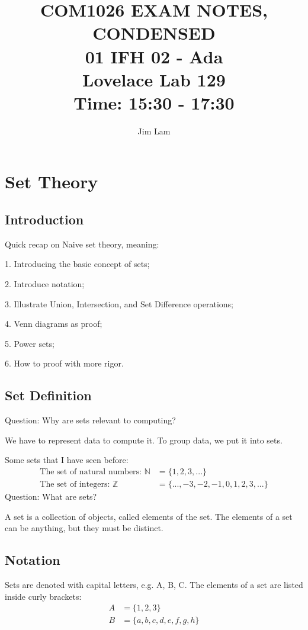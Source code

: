 \documentclass{article}
\author{Jim Lam}
\begin{document}
\title{%
    COM1026 EXAM NOTES, CONDENSED \\
    \large 01 IFH 02 - Ada \\
    Lovelace Lab 129 \\
    Time: 15:30 - 17:30 \\
}
\maketitle
\tableofcontents
\section{Set Theory}

\subsection{Introduction}
Quick recap on Naive set theory, meaning:

1. Introducing the basic concept of sets;

2. Introduce notation;

3. Illustrate Union, Intersection, and Set Difference operations;

4. Venn diagrams as proof;

5. Power sets;

6. How to proof with more rigor.

\subsection{Set Definition}

Question: Why are sets relevant to computing?

We have to represent data to compute it.
To group data, we put it into sets.

Some sets that I have seen before:
\begin{align*}
    \text{The set of natural numbers: } \mathbb{N} & = \{1, 2, 3, ...\}                    \\
    \text{The set of integers: } \mathbb{Z}        & = \{..., -3, -2, -1, 0, 1, 2, 3,...\}
\end{align*}
Question: What are sets?


A set is a collection of objects, called elements of the set. The elements of a set can be anything, but they must be distinct.

\subsection{Notation}
Sets are denoted with capital letters, e.g. A, B, C. The elements of a set are listed inside curly brackets:
\begin{align*}
    A & = \{1, 2, 3\}                \\
    B & = \{a, b, c, d, e, f, g, h\}
\end{align*}
\end{document}
